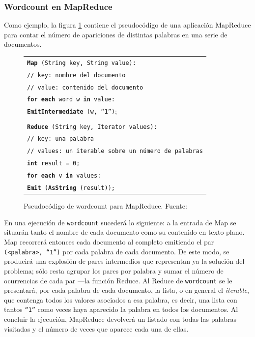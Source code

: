 \subsubsection{Wordcount en MapReduce}\label{subsubsec:wordcount}
\noindent Como ejemplo, la figura \ref{fig:wordcount} contiene el pseudoc\'odigo de una aplicaci\'on MapReduce para contar el n\'umero de apariciones de distintas palabras en una serie de documentos.\newline

\begin{figure}[tbp]
 \begin{center}
  \begin{tabular}{|l|}
   \hline
   \texttt{{\bf Map} (String key, String value):} \\
   \texttt{// key: nombre del documento} \\
   \texttt{// value: contenido del documento} \\
   \texttt{{\bf for each} word w {\bf in} value:} \\
   \texttt{{\bf EmitIntermediate} (w, ``1'')};\\ \\

   \texttt{{\bf Reduce} (String key, Iterator values):} \\
   \texttt{// key: una palabra} \\
   \texttt{// values: un iterable sobre un n\'umero de palabras} \\
   \texttt{{\bf int} result = 0;} \\
   \texttt{{\bf for each} v {\bf in} values:} \\
   \texttt{{\bf Emit} ({\bf AsString} (result));} \\
   \hline
  \end{tabular}
  \caption{Pseudoc\'odigo de wordcount para MapReduce. Fuente: \cite{googlemapreduce}}
  \label{fig:wordcount}
 \end{center}
\end{figure}

En una ejecuci\'on de \texttt{wordcount} suceder\'a lo siguiente: a la entrada de Map se situar\'an tanto el nombre de cada documento como su contenido en texto plano. Map recorrer\'a entonces cada documento al completo emitiendo el par \texttt{(<palabra>, ``1'')} por cada palabra de cada documento. De este modo, se producir\'a una explosi\'on de pares intermedios que representan ya la soluci\'on del problema; s\'olo resta agrupar los pares por palabra y sumar el n\'umero de ocurrencias de cada par ---la funci\'on Reduce. Al Reduce de \texttt{wordcount} se le presentar\'a, por cada palabra de cada documento, la lista, o en general el \emph{iterable}, que contenga todos los valores asociados a esa palabra, es decir, una lista con tantos \texttt{``1''} como veces haya aparecido la palabra en todos los documentos. Al concluir la ejecuci\'on, MapReduce devolver\'a un listado con todas las palabras visitadas y el n\'umero de veces que aparece cada una de ellas.


